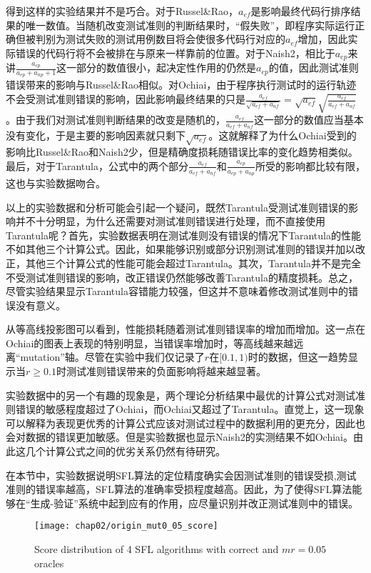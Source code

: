 得到这样的实验结果并不是巧合。对于Russel\&Rao，$a_{ef}$是影响最终代码行排序结果的唯一数值。当随机改变测试准则的判断结果时，“假失败”，即程序实际运行正确但被判别为测试失败的测试用例数目将会使很多代码行对应的$a_{ef}$增加，因此实际错误的代码行将不会被排在与原来一样靠前的位置。对于Naish2，相比于$a_{ep}$来讲$\frac{a_{ep}}{a_{ep} + a_{np} + 1}$这一部分的数值很小，起决定性作用的仍然是$a_{ep}$的值，因此测试准则错误带来的影响与Russel\&Rao相似。对Ochiai，由于程序执行测试时的运行轨迹不会受测试准则错误的影响，因此影响最终结果的只是$\frac{a_{ef}}{\sqrt{a_{ef} + a_{nf}}} = \sqrt{a_{ef}}\sqrt{\frac{a_{ef}}{a_{ef} + a_{nf}}}$。由于我们对测试准则判断结果的改变是随机的，$\frac{a_{ef}}{a_{ef} + a_{nf}}$这一部分的数值应当基本没有变化，于是主要的影响因素就只剩下$\sqrt{a_{ef}}$。这就解释了为什么Ochiai受到的影响比Russel\&Rao和Naish2少，但是精确度损耗随错误比率的变化趋势相类似。最后，对于Tarantula，公式中的两个部分$\frac{a_{ef}}{a_{ef} + a_{nf}}$和$\frac{a_{ep}}{a_{ep} + a_{np}}$所受的影响都比较有限，这也与实验数据吻合。

以上的实验数据和分析可能会引起一个疑问，既然Tarantula受测试准则错误的影响并不十分明显，为什么还需要对测试准则错误进行处理，而不直接使用Tarantula呢？首先，实验数据表明在测试准则没有错误的情况下Tarantula的性能不如其他三个计算公式。因此，如果能够识别或部分识别测试准则的错误并加以改正，其他三个计算公式的性能可能会超过Tarantula。其次，Tarantula并不是完全不受测试准则错误的影响，改正错误仍然能够改善Tarantula的精度损耗。总之，尽管实验结果显示Tarantula容错能力较强，但这并不意味着修改测试准则中的错误没有意义。

从等高线投影图可以看到，性能损耗随着测试准则错误率的增加而增加。这一点在Ochiai的图表上表现的特别明显，当错误率增加时，等高线越来越远离“mutation”轴。尽管在实验中我们仅记录了$r$在$[0.1,1)$时的数据，但这一趋势显示当$r \ge 0.1$时测试准则错误带来的负面影响将越来越显著。

实验数据中的另一个有趣的现象是，两个理论分析结果中最优的计算公式对测试准则错误的敏感程度超过了Ochiai，而Ochiai又超过了Tarantula。直觉上，这一现象可以解释为表现更优秀的计算公式应该对测试过程中的数据利用的更充分，因此也会对数据的错误更加敏感。但是实验数据也显示Naish2的实测结果不如Ochiai。由此这几个计算公式之间的优劣关系仍然有待研究。

在本节中，实验数据说明SFL算法的定位精度确实会因测试准则的错误受损,测试准则的错误率越高，SFL算法的准确率受损程度越高。因此，为了使得SFL算法能够在“生成-验证”系统中起到应有的作用，应尽量识别并改正测试准则中的错误。
\begin{figure}
	\centering
	\texttt{[image: chap02/origin\_mut0\_05\_score]}
	\caption{Score distribution of 4 SFL algorithms with correct and $mr = 0.05$ oracles}
	\label{fig:score-correct-0.05}
\end{figure}

